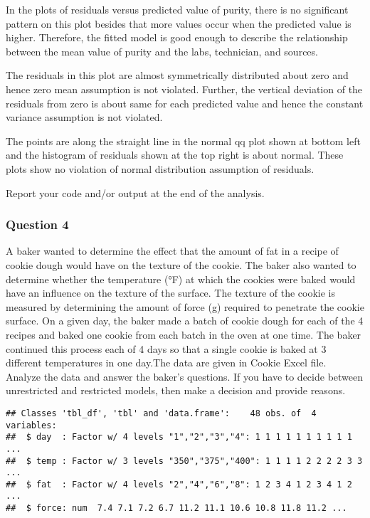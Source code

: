 \documentclass[12pt,]{article}
\begin{document}
In the plots of residuals versus predicted value of purity, there is no
significant pattern on this plot besides that more values occur when the
predicted value is higher. Therefore, the fitted model is good enough to
describe the relationship between the mean value of purity and the labs,
technician, and sources.

The residuals in this plot are almost symmetrically distributed about
zero and hence zero mean assumption is not violated. Further, the
vertical deviation of the residuals from zero is about same for each
predicted value and hence the constant variance assumption is not
violated.

The points are along the straight line in the normal qq plot shown at
bottom left and the histogram of residuals shown at the top right is
about normal. These plots show no violation of normal distribution
assumption of residuals.

\textcolor[rgb]{0.7,0.7,0.7}{Report your code and/or output at the end of the analysis.}

\hypertarget{question-4}{%
\subsubsection{Question 4}\label{question-4}}

\textcolor[rgb]{0.7,0.7,0.7}{A baker wanted to determine the effect that the amount of fat in a recipe of cookie dough would have on the texture of the cookie. The baker also wanted to determine whether the temperature (°F) at which the cookies were baked would have an influence on the texture of the surface. The texture of the cookie is measured by determining the amount of force (g) required to penetrate the cookie surface.}
\textcolor[rgb]{0.7,0.7,0.7}{On a given day, the baker made a batch of cookie dough for each of the 4 recipes and baked one cookie from each batch in the oven at one time. The baker continued this process each of 4 days so that a single cookie is baked at 3 different temperatures in one day.The data are given in Cookie Excel file.}
\textcolor[rgb]{0.7,0.7,0.7}{Analyze the data and answer the baker's questions. If you have to decide between unrestricted and restricted models, then make a decision and provide reasons.}

\begin{verbatim}
## Classes 'tbl_df', 'tbl' and 'data.frame':    48 obs. of  4 variables:
##  $ day  : Factor w/ 4 levels "1","2","3","4": 1 1 1 1 1 1 1 1 1 1 ...
##  $ temp : Factor w/ 3 levels "350","375","400": 1 1 1 1 2 2 2 2 3 3 ...
##  $ fat  : Factor w/ 4 levels "2","4","6","8": 1 2 3 4 1 2 3 4 1 2 ...
##  $ force: num  7.4 7.1 7.2 6.7 11.2 11.1 10.6 10.8 11.8 11.2 ...
\end{verbatim}
\end{document}
